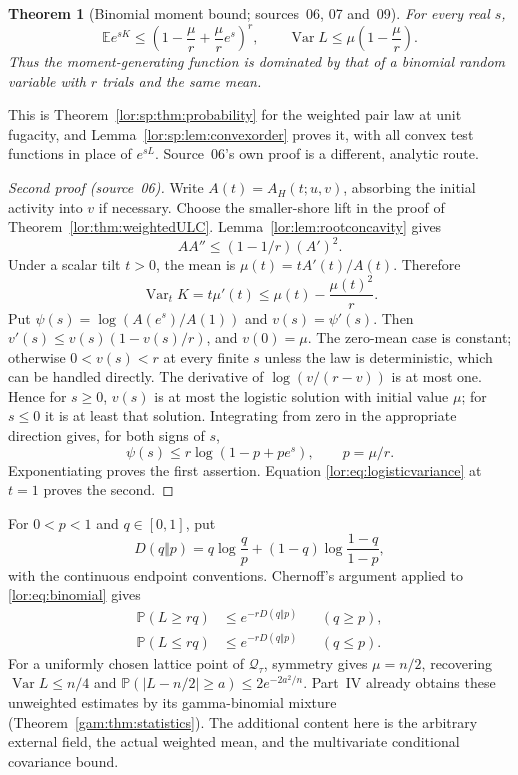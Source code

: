 \documentclass[11pt]{article}
\numberwithin{equation}{section}
\newtheorem{theorem}{Theorem}[section]
\theoremstyle{definition}
\newcommand{\Qt}{\mathcal Q_\tau}
\newcommand{\Var}{\operatorname{Var}}
\newcommand{\EE}{\mathbb E}
\newcommand{\PP}{\mathbb P}
\begin{document}
\begin{theorem}[Binomial moment bound; sources~06, 07 and~09]\label{lor:thm:binomial}
For every real $s$,
\begin{equation}
 \EE e^{sK}\le
       \left(1-\frac\mu r+\frac\mu r e^s\right)^r,
 \qquad
 \Var L\le\mu\left(1-\frac\mu r\right).
 \label{lor:eq:binomial}
\end{equation}
Thus the moment-generating function is dominated by that of a binomial
random variable with $r$ trials and the same mean.
\end{theorem}
This is Theorem~\ref{lor:sp:thm:probability} for the weighted pair law
at unit fugacity, and Lemma~\ref{lor:sp:lem:convexorder} proves it, with all
convex test functions in place of $e^{sL}$. Source~06's own proof is a
different, analytic route.
\begin{proof}[Second proof (source~06)]
Write $A(t)=A_H(t;u,v)$, absorbing the initial activity into $v$ if
necessary. Choose the smaller-shore lift in the proof of
Theorem~\ref{lor:thm:weightedULC}. Lemma~\ref{lor:lem:rootconcavity} gives
\[
 A A''\le(1-1/r)(A')^2.
\]
Under a scalar tilt $t>0$, the mean is $\mu(t)=tA'(t)/A(t)$. Therefore
\begin{equation}
 \Var_tK=t\mu'(t)
 \le\mu(t)-\frac{\mu(t)^2}{r}.
 \label{lor:eq:logisticvariance}
\end{equation}
Put $\psi(s)=\log(A(e^s)/A(1))$ and $v(s)=\psi'(s)$. Then
$v'(s)\le v(s)(1-v(s)/r)$, and $v(0)=\mu$.
The zero-mean case is constant; otherwise $0<v(s)<r$ at every finite $s$
unless the law is deterministic, which can be handled directly.
The derivative of $\log(v/(r-v))$ is at most one. Hence for $s\ge0$,
$v(s)$ is at most the logistic solution with initial value $\mu$; for
$s\le0$ it is at least that solution. Integrating from zero in the
appropriate direction gives, for both signs of $s$,
\[
 \psi(s)\le r\log(1-p+pe^s),\qquad p=\mu/r.
\]
Exponentiating proves the first assertion. Equation
\eqref{lor:eq:logisticvariance} at $t=1$ proves the second.
\end{proof}

For $0<p<1$ and $q\in[0,1]$, put
\[
 D(q\Vert p)=q\log\frac qp+(1-q)\log\frac{1-q}{1-p},
\]
with the continuous endpoint conventions. Chernoff's argument applied to
\eqref{lor:eq:binomial} gives
\begin{equation}
 \begin{aligned}
 \PP(L\ge rq)&\le e^{-rD(q\Vert p)} &&(q\ge p),\\
 \PP(L\le rq)&\le e^{-rD(q\Vert p)} &&(q\le p).
 \end{aligned}
 \label{lor:eq:chernoff}
\end{equation}
For a uniformly chosen lattice point of $\Qt$, symmetry gives
$\mu=n/2$, recovering $\Var L\le n/4$ and
$\PP(|L-n/2|\ge a)\le2e^{-2a^2/n}$. Part~IV already obtains these
unweighted estimates by its gamma-binomial mixture (Theorem~\ref{gam:thm:statistics}). The additional content
here is the arbitrary external field, the actual weighted mean, and the
multivariate conditional covariance bound.
\end{document}
